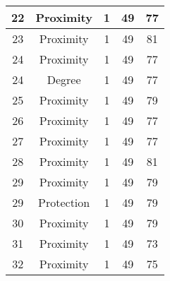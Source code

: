 \documentclass[results.tex]{subfiles}
\begin{document}
\begin{center}
\begin{tabular}{| c || c | c | c | c |}
            \hline
            22                      & Proximity                    & 1                      & 49                      & 77                   \\
            \hline
            23                      & Proximity                    & 1                      & 49                      & 81                   \\
            \hline
            24                      & Proximity                    & 1                      & 49                      & 77                   \\
            \hline
            24                      & Degree                       & 1                      & 49                      & 77                   \\
            \hline
            25                      & Proximity                    & 1                      & 49                      & 79                   \\
            \hline
            26                      & Proximity                    & 1                      & 49                      & 77                   \\
            \hline
            27                      & Proximity                    & 1                      & 49                      & 77                   \\
            \hline
            28                      & Proximity                    & 1                      & 49                      & 81                   \\
            \hline
            29                      & Proximity                    & 1                      & 49                      & 79                   \\
            \hline
            29                      & Protection                   & 1                      & 49                      & 79                   \\
            \hline
            30                      & Proximity                    & 1                      & 49                      & 79                   \\
            \hline
            31                      & Proximity                    & 1                      & 49                      & 73                   \\
            \hline
            32                      & Proximity                    & 1                      & 49                      & 75                   \\

\end{tabular}
\end{center}
\end{document}
